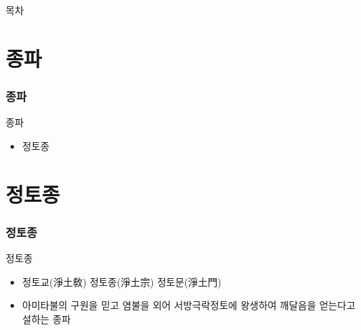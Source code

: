 \documentclass[aspectratio=1610,17pt,xcolor=pdftex,dvipsnames,table,handout]{beamer}
\begin{document}
		\begin{frame} [plain]{목차}
		\tableofcontents%
		\end{frame}
		

		\section{종파}
		\begin{frame} [t,plain]
		\frametitle{종파}
			\begin{block} {종파}
			\setlength{\leftmargini}{5em}			
			\begin{itemize}
				\item  정토종
			\end{itemize}
			\end{block}						

		\end{frame}						
		

		\section{정토종}
		\begin{frame} [t,plain]
		\frametitle{정토종}
			\begin{block} { 정토종 }
			\setlength{\leftmargini}{2em}			
			\begin{itemize}
				\item 정토교(淨土敎) 정토종(淨土宗) 정토문(淨土門)
				\item 아미타불의 구원을 믿고 
						염불을 외어 
						서방극락정토에 왕생하여 깨달음을 얻는다고 설하는 종파

			\end{itemize}
			\end{block}			

								
		\end{frame}						
	


			


%
\end{document}
